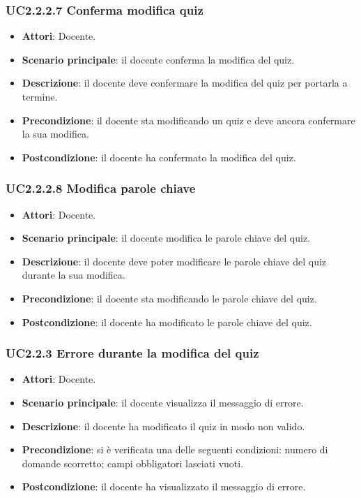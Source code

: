 \subsubsection{UC2.2.2.7 Conferma modifica quiz}
\begin{itemize}
\item \textbf{Attori}: Docente.
\item \textbf{Scenario principale}: il docente conferma la modifica del quiz.
\item \textbf{Descrizione}: il docente deve confermare la modifica del quiz per portarla a termine.
\item \textbf{Precondizione}: il docente sta modificando un quiz e deve ancora confermare la sua modifica.
\item \textbf{Postcondizione}: il docente ha confermato la modifica del quiz.
\end{itemize}
\subsubsection{UC2.2.2.8 Modifica parole chiave}
\begin{itemize}
\item \textbf{Attori}: Docente.
\item \textbf{Scenario principale}: il docente modifica le parole chiave del quiz.
\item \textbf{Descrizione}: il docente deve poter modificare le parole chiave del quiz durante la sua modifica.
\item \textbf{Precondizione}: il docente sta modificando le parole chiave del quiz.
\item \textbf{Postcondizione}: il docente ha modificato le parole chiave del quiz.
\end{itemize}
\subsubsection{UC2.2.3 Errore durante la modifica del quiz}
\begin{itemize}
\item \textbf{Attori}: Docente.
\item \textbf{Scenario principale}: il docente visualizza il messaggio di errore.
\item \textbf{Descrizione}: il docente ha modificato il quiz in modo non valido.
\item \textbf{Precondizione}: si è verificata una delle seguenti condizioni: numero di domande scorretto; campi obbligatori lasciati vuoti.
\item \textbf{Postcondizione}: il docente ha visualizzato il messaggio di errore.
\end{itemize}
